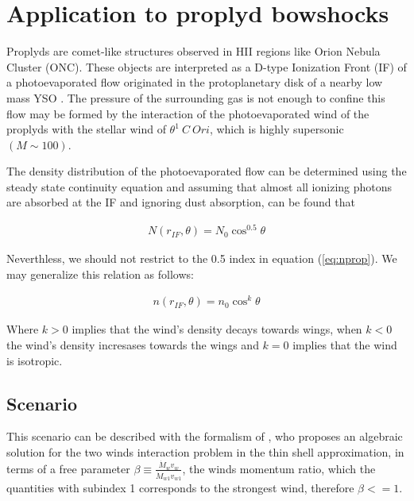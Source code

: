 \section{Application to proplyd bowshocks}
\label{sec:application}
\newcommand\thC{\(\theta^1\)\,Ori~C}
\newcommand\CRW{\citetalias{Canto:1996}}

Proplyds are comet-like structures observed in HII regions like Orion Nebula Cluster (ONC). 
These objects are interpreted as a D-type Ionization Front (IF) of a photoevaporated flow 
originated in the protoplanetary disk of a nearby low mass YSO \citep{Johnstone:1998}.
The pressure of the surrounding gas is not enough to confine this flow \citep{HA:1998}
may be formed by the interaction of the photoevaporated wind of the proplyds with the stellar wind of $\theta^1~C~Ori$, which is highly supersonic $(M \sim 100)$. 

The density distribution of the photoevaporated flow can be determined using the steady state continuity equation and assuming that almost all ionizing photons are absorbed at the IF \citep{HA:1998} and ignoring dust absorption, can be found that

\begin{align}
N(r_{IF},\theta) = N_0 \cos^{0.5}\theta
\label{eq:nprop}
\end{align}

Neverthless, we should not restrict to the 0.5 index in equation (\ref{eq:nprop}). We may generalize this relation as follows:

\begin{align}
n(r_{IF},\theta) = n_0 \cos^{k}\theta
\label{eq:ngen}
\end{align}

Where $k >0$ implies that the wind's density decays towards wings, when $k<0$ the wind's density incresases towards the wings and $k=0$ implies that the wind is isotropic.

\subsection{\CRW{} Scenario}
\label{sec:crw-scenario}
This scenario can be described with the formalism of
\citet[][hereafter \CRW{}]{Canto:1996}, who proposes an algebraic
solution for the two winds interaction problem in the thin shell
approximation, in terms of a free parameter
$\beta\equiv\frac{\dot{M}_wv_w}{\dot{M}_{w1}v_{w1}}$, the winds
momentum ratio, which the quantities with subindex 1 corresponds to
the strongest wind, therefore $\beta<=1$.

